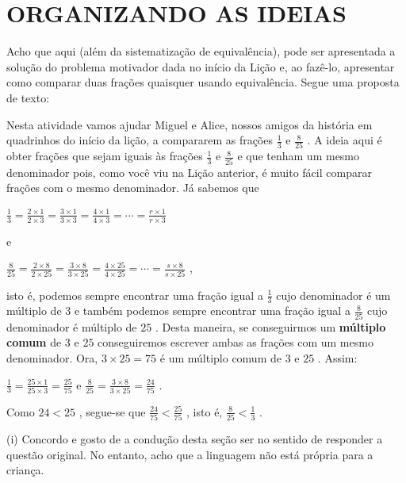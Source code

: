 \documentclass[a4,12pt]{book}
\newcounter{atividade}
\begin{document}
\section*{ ORGANIZANDO AS IDEIAS }



\begin{nota*}[breakable]{}{}  
  Acho que aqui (além da sistematização de equivalência), pode ser apresentada a solução do problema motivador dada no início da Lição e, ao fazê-lo, apresentar como comparar duas frações quaisquer usando equivalência. Segue uma proposta de texto:  
  
  Nesta atividade vamos ajudar Miguel e Alice, nossos amigos da história em quadrinhos do início da lição, a compararem as frações   $\frac{1}{3}$   e   $\frac{8}{25}$  . A ideia aqui é obter frações que sejam iguais às frações   $\frac{1}{3}$   e   $\frac{8}{25}$   e que tenham um mesmo denominador pois, como você viu na Lição anterior, é muito fácil comparar frações com o mesmo denominador. Já sabemos que  
  
  $\frac{1}{3} = \frac{2 \times 1}{2 \times 3} = \frac{3 \times 1}{3 \times 3} = \frac{4 \times 1}{4 \times 3} = \cdots = \frac{r \times 1}{r \times 3}$  
  
  e  
  
  $\frac{8}{25} = \frac{2 \times 8}{2 \times 25} = \frac{3 \times 8}{3 \times 25} = \frac{4 \times 25}{4 \times 25} = \cdots = \frac{s \times 8}{s \times 25}$  ,  
  
  isto é, podemos sempre encontrar uma fração igual a   $\frac{1}{3}$   cujo denominador é um múltiplo de   $3$   e também podemos sempre encontrar uma fração igual a   $\frac{8}{25}$   cujo denominador é múltiplo de   $25$  . Desta maneira, se conseguirmos um   {\bf múltiplo comum}   de   $3$   e   $25$   conseguiremos escrever ambas as frações com um mesmo denominador. Ora,   $3 \times 25 = 75$   é um múltiplo comum de   $3$   e   $25$  . Assim:  
  
  $\frac{1}{3} = \frac{25 \times 1}{25 \times 3} = \frac{25}{75}$   e  
  $\frac{8}{25} = \frac{3 \times 8}{3 \times 25} = \frac{24}{75}$  .  
  
  Como   $24 < 25$  , segue-se que   $\frac{24}{75} < \frac{25}{75}$  , isto é,   $\frac{8}{25} < \frac{1}{3}$  .  
\end{nota*}



(i) Concordo e gosto de a condução desta seção ser no sentido de responder a questão original. No entanto, acho que a linguagem não está própria para a criança. 
\end{document}
